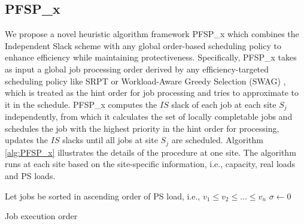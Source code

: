 \subsection{PFSP\_x}
We propose a novel heuristic algorithm framework PFSP\_x which combines the Independent Slack scheme with any global order-based scheduling policy to enhance efficiency while maintaining protectiveness. Specifically, PFSP\_x takes as input a global job processing order derived by any efficiency-targeted scheduling policy like SRPT or Workload-Aware Greedy Selection (SWAG) \cite{hung2015scheduling}, which is treated as the hint order for job processing and tries to approximate to it in the schedule. PFSP\_x computes the $IS$ slack of each job at each site $S_j$ independently, from which it calculates the set of locally completable jobs and schedules the job with the highest priority in the hint order for processing, updates the $IS$ slacks until all jobs at site $S_j$ are scheduled. Algorithm \ref{alg:PFSP_x} illustrates the details of the procedure at one site. The algorithm runs at each site based on the site-specific information, i.e., capacity, real loads and PS loads.


\begin{algorithm}[t]
  \caption{PFSP\_x Algorithm at Individual Sites}\label{alg:PFSP_x}
  
  \BlankLine
  
  Let jobs be sorted in ascending order of PS load, i.e., $v_1 \le v_2 \le \dots \le v_n$\;
  $\sigma \leftarrow 0$\;
  \BlankLine
  
  \BlankLine

  \BlankLine
  \Return Job execution order\;
\end{algorithm}


